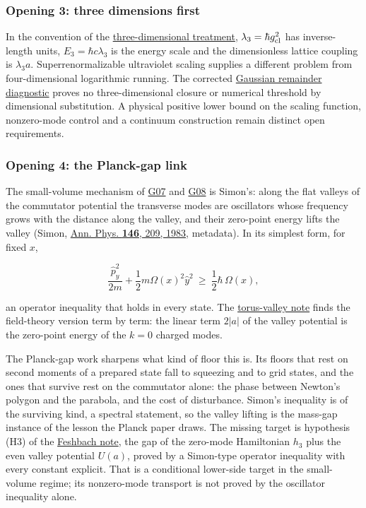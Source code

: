 \documentclass[11pt,a4paper]{article}
\begin{document}
\hypertarget{opening-3-three-dimensions-first}{%
\subsubsection{Opening 3: three dimensions
first}\label{opening-3-three-dimensions-first}}

In the convention of the
\href{three-dimensional-gap-one-function.md}{three-dimensional
treatment}, \(\lambda_3=\hbar g_{\rm cl}^2\) has inverse-length units,
\(E_3=\hbar c\lambda_3\) is the energy scale and the dimensionless
lattice coupling is \(\lambda_3a\). Superrenormalizable ultraviolet
scaling supplies a different problem from four-dimensional logarithmic
running. The corrected \href{small-field-step-gaussian.md}{Gaussian
remainder diagnostic} proves no three-dimensional closure or numerical
threshold by dimensional substitution. A physical positive lower bound
on the scaling function, nonzero-mode control and a continuum
construction remain distinct open requirements.

\hypertarget{opening-4-the-planck-gap-link}{%
\subsubsection{Opening 4: the Planck-gap
link}\label{opening-4-the-planck-gap-link}}

The small-volume mechanism of \href{low-dimensional-mass-gap.md}{G07}
and
\href{low-dimensional-mass-gap.md\#conditional-orbit-area-bounds-and-state-counting}{G08}
is Simon's: along the flat valleys of the commutator potential the
transverse modes are oscillators whose frequency grows with the distance
along the valley, and their zero-point energy lifts the valley (Simon,
\href{https://doi.org/10.1016/0003-4916(83)90057-X}{Ann. Phys.
\textbf{146}, 209, 1983}, metadata). In its simplest form, for fixed
\(x\),

\[\frac{\hat p_y^2}{2m}+\frac12m\Omega(x)^2\hat y^2\ \ge\ \frac12\hbar\,\Omega(x),\]

an operator inequality that holds in every state. The
\href{torus-valley-potential.md}{torus-valley note} finds the
field-theory version term by term: the linear term \(2|a|\) of the
valley potential is the zero-point energy of the \(k=0\) charged modes.

The Planck-gap work sharpens what kind of floor this is. Its floors that
rest on second moments of a prepared state fall to squeezing and to grid
states, and the ones that survive rest on the commutator alone: the
phase between Newton's polygon and the parabola, and the cost of
disturbance. Simon's inequality is of the surviving kind, a spectral
statement, so the valley lifting is the mass-gap instance of the lesson
the Planck paper draws. The missing target is hypothesis (H3) of the
\href{weak-coupling-feshbach-reduction.md}{Feshbach note}, the gap of
the zero-mode Hamiltonian \(h_3\) plus the even valley potential
\(U(a)\), proved by a Simon-type operator inequality with every constant
explicit. That is a conditional lower-side target in the small-volume
regime; its nonzero-mode transport is not proved by the oscillator
inequality alone.
\end{document}
